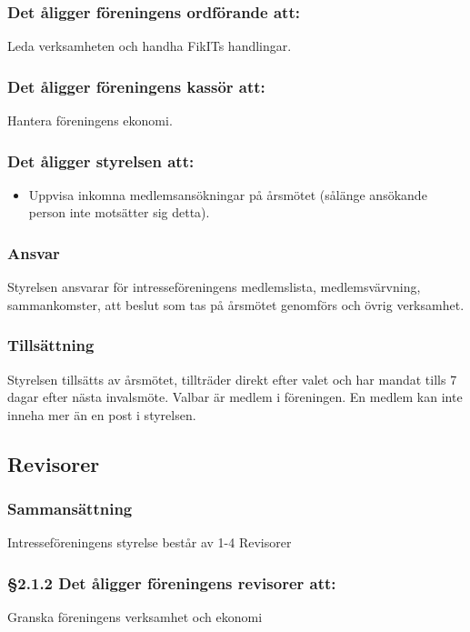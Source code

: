 \documentclass[11pt, noincludeaddress]{classes/cthit}
\begin{document}
\subsubsection{Det åligger föreningens ordförande att:}
Leda verksamheten och handha FikITs handlingar.

\subsubsection{Det åligger föreningens kassör att:}
Hantera föreningens ekonomi. 

\subsubsection{Det åligger styrelsen att:}
\begin{itemize}
    \item Uppvisa inkomna medlemsansökningar på årsmötet (sålänge ansökande person inte motsätter sig detta).
\end{itemize}


\subsubsection{Ansvar}
Styrelsen ansvarar för intresseföreningens medlemslista, medlemsvärvning, sammankomster, att beslut som tas på årsmötet genomförs och övrig verksamhet.

\subsubsection{Tillsättning}
Styrelsen tillsätts av årsmötet, tillträder direkt efter valet och har
mandat tills 7 dagar efter nästa invalsmöte. Valbar är medlem i föreningen. En
medlem kan inte inneha mer än en post i styrelsen.


\subsection{Revisorer}

\subsubsection{Sammansättning}
Intresseföreningens styrelse består av 1-4
Revisorer

\subsubsection{§2.1.2 Det åligger föreningens revisorer att:}
Granska föreningens verksamhet och ekonomi
\end{document}

